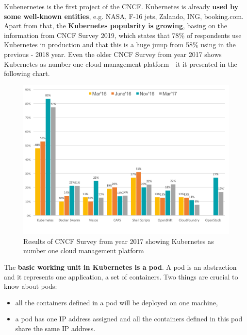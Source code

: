 Kubenernetes is the first project of the CNCF\cite{article-state-machine}. Kubernetes is already \textbf{used by some well-known entities}, e.g. NASA\cite{nasa}, F-16 jets\cite{online-f16}, Zalando\cite{online-zalando}, ING\cite{online-ing}, booking.com\cite{online-bookingcom}. Apart from that, the \textbf{Kubernetes popularity is growing}, basing on the information from CNCF Survey 2019, which states that 78\% of respondents use Kubernetes in production and that this is a huge jump from 58\% using in the previous - 2018 year\cite{cncf-2019}. Even the older CNCF Survey from year 2017 shows Kubernetes as number one cloud management platform - it it presented in the following chart.

\begin{figure}[H]
    \centering
    \includegraphics[width=12cm]{figures/cncf-container-orchestrators.png}
    \captionsetup{justification=centering,margin=2cm}
    \caption{Results of CNCF Survey from year 2017 showing Kubernetes as number one cloud management platform\cite{cncf-2017}}
\end{figure}

The \textbf{basic working unit in Kubernetes is a pod}. A pod is an abstraction and it represents one application, a set of containers. Two things are crucial to know about pods\cite{article-modelling-performance-k8s}:
\begin{itemize}
\item all the containers defined in a pod will be deployed on one machine,
\item a pod has one IP address assigned and all the containers defined in this pod share the same IP address.
\end{itemize}

